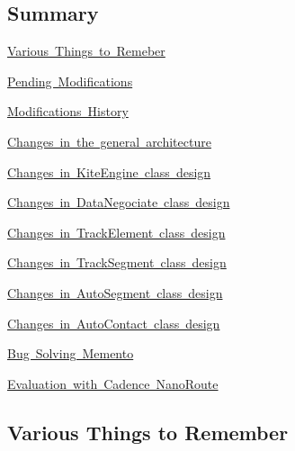 \hypertarget{pageNotes_Summary}{}\subsection{Summary}\label{pageNotes_Summary}

\begin{DoxyItemize}
\item \mbox{\hyperlink{pageNotes_ssecVariousNotes}{Various Things to Remeber}}
\item \mbox{\hyperlink{pageNotes_secPendingModifications}{Pending Modifications}}
\item \mbox{\hyperlink{pageNotes_secModificationsHistory}{Modifications History}}
\item \mbox{\hyperlink{pageNotes_ssecArchitectureChanges}{Changes in the general architecture}}
\begin{DoxyItemize}
\item \mbox{\hyperlink{pageNotes_ssecModificationsKiteEngine}{Changes in Kite\+Engine class design}}
\item \mbox{\hyperlink{pageNotes_ssecModificationsDataNegociate}{Changes in Data\+Negociate class design}}
\item \mbox{\hyperlink{pageNotes_ssecModificationsTrackElement}{Changes in Track\+Element class design}}
\item \mbox{\hyperlink{pageNotes_ssecModificationsTrackSegment}{Changes in Track\+Segment class design}}
\item \mbox{\hyperlink{pageNotes_ssecModificationsAutoSegment}{Changes in Auto\+Segment class design}}
\item \mbox{\hyperlink{pageNotes_ssecModificationsAutoContact}{Changes in Auto\+Contact class design}}
\end{DoxyItemize}
\item \mbox{\hyperlink{pageNotes_ssecBugBusting}{Bug Solving Memento}}
\item \mbox{\hyperlink{pageNotes_ssecNanoRoute}{Evaluation with Cadence Nano\+Route}}
\end{DoxyItemize}\hypertarget{pageNotes_ssecVariousNotes}{}\subsection{Various Things to Remember}\label{pageNotes_ssecVariousNotes}

